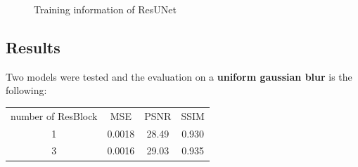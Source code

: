 \begin{figure}[H]
\begin{subfigure}{\textwidth}
    \end{subfigure}
    \caption{Training information of ResUNet}
\end{figure}
 
\subsection{Results}
Two models were tested and the evaluation on a \textbf{uniform gaussian blur} is the following:
\begin{center}
    \small
    \begin{tabularx}{300pt}{cccc}
        \centering
        number of ResBlock & MSE & PSNR & SSIM \\
        1 & 0.0018 & 28.49 & 0.930 \\
        3 & 0.0016 & 29.03 & 0.935
    \end{tabularx}    
\end{center}

